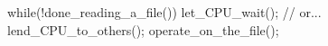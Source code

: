 \documentclass[varwidth=15.2em,crop]{standalone}
\begin{document}
\begin{ccode}
while(!done_reading_a_file())
{
  let_CPU_wait();
  // or...
  lend_CPU_to_others();
}
operate_on_the_file();  
\end{ccode}
\end{document}

